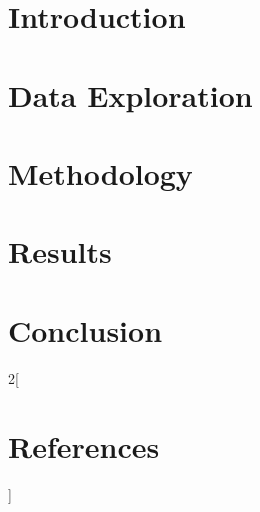 \documentclass[NOTE, disdraft=false, UKenglish]{\DISCDTLATEXPATH UCLCDTDISdoc}
\begin{document}
\maketitle

\tableofcontents

\clearpage

\newpage
\section{Introduction}
\label{sec:introduction}


\section{Data Exploration}
\label{sec:data}


\section{Methodology}
\label{sec:methodology}


\section{Results}
\label{sec:results}


\section{Conclusion}
\label{sec:conclusion}


\nocite{*}
\begin{multicols}{2}[\section*{References}]
\printbibliography[heading=none]
\end{multicols}
\end{document}
